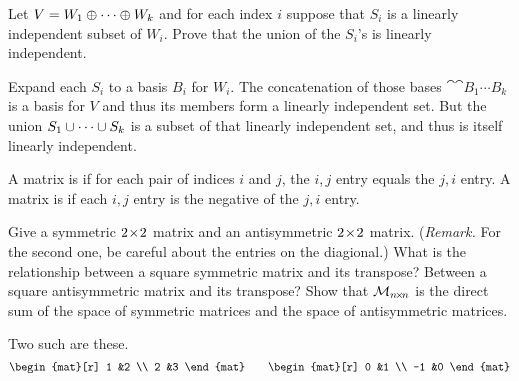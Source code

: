 \begin{exercises}
\begin{answer}
    \end{answer}
  \item 
    Let \( V=W_1\oplus\cdots\oplus W_k \) and for each index
    \( i \) suppose that \( S_i \) is a linearly independent subset of
    \( W_i \).
    Prove that the union of the \( S_i \)'s is linearly independent.
    \begin{answer}
      Expand each \( S_i \) to a basis $B_i$ for \( W_i \).
      The concatenation of those bases $\cat{\cat{B_1}{\cdots}}{B_k}$
      is a basis for \( V \) and thus its members form a linearly independent
      set.
      But the union $S_1\cup\cdots\cup S_k$ is a subset 
      of that linearly independent set, and thus is
      itself linearly independent.  
     \end{answer}
  \item 
    A matrix is %
    if for each pair of indices \( i \) and
    \( j \), the \( i,j \) entry equals the \( j,i \) entry.
    A matrix is %
    if each \( i,j \) entry is the
    negative of the \( j,i \) entry.
    \begin{exparts}
      \partsitem Give a symmetric $2 \! \times \! 2$ matrix and an antisymmetric
        $2 \! \times \! 2$ matrix.
        (\textit{Remark.}
        For the second one, be careful about the entries on the diagional.)
      \partsitem What is the relationship between a square symmetric matrix and
        its transpose?
        Between a square antisymmetric matrix and its transpose?
      \partsitem Show that \( \mathcal{M}_{n \! \times \! n} \) is the direct sum of 
        the space of symmetric matrices and the space of antisymmetric 
        matrices.
    \end{exparts}
    \begin{answer}
      \begin{exparts}
        \partsitem Two such are these.
          \begin{equation*}
            \begin{mat}[r]
              1  &2  \\
              2  &3
            \end{mat}
            \qquad
            \begin{mat}[r]
              0  &1  \\
              -1 &0
            \end{mat}
          \end{equation*}

\end{exparts}
\end{answer}
\end{exercises}
